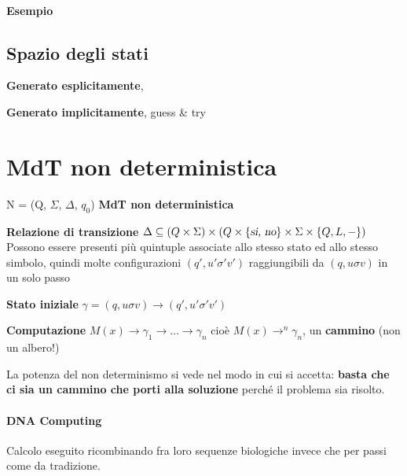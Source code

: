 \documentclass[10pt]{book}
\begin{document}
\paragraph{Esempio} %

\subsection{Spazio degli stati}
\begin{list}{}{Lo spazo degli stati di una MdT può essere}
	\item \textbf{Generato esplicitamente}, 
	\item \textbf{Generato implicitamente}, guess \& try
\end{list}
\section{MdT non deterministica}
N = (Q, $\Sigma$, $\Delta$, $q_0$) \textbf{MdT non deterministica}
\begin{list}{}{}
	\item \textbf{Relazione di transizione} $\Delta \subseteq (Q\times\Sigma)\times(Q\times\{\textsl{si, no}\}\times\Sigma\times\{Q, L, -\})$\\
	Possono essere presenti più quintuple associate allo stesso stato ed allo stesso simbolo, quindi molte configurazioni $(q', u'\sigma'v')$ raggiungibili da $(q, u\sigma v)$ in un solo passo
	\item \textbf{Stato iniziale} $\gamma = (q, u\sigma v) \rightarrow (q', u'\sigma'v')$
	\item \textbf{Computazione} $M(x) \rightarrow\gamma_1\rightarrow\ldots\rightarrow\gamma_n$ cioè $M(x) \rightarrow^n\gamma_n$, un \textbf{cammino} (non un albero!)
\end{list}
La potenza del non determinismo si vede nel modo in cui si accetta: \textbf{basta che ci sia un cammino che porti alla soluzione} perché il problema sia risolto.
\pagebreak
\paragraph{DNA Computing} Calcolo eseguito ricombinando fra loro sequenze biologiche invece che per passi come da tradizione.
\end{document}
